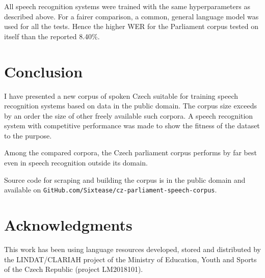 \documentclass[runningheads]{llncs}
\begin{document}
All speech recognition systems were trained with the same hyperparameters as
described above. For a fairer comparison, a common, general language model was
used for all the tests. Hence the higher WER for the Parliament corpus tested on
itself than the reported 8.40\%.

\section{Conclusion}

I have presented a new corpus of spoken Czech suitable for training speech
recognition systems based on data in the public domain. The corpus size exceeds
by an order the size of other freely available such corpora. A speech
recognition system with competitive performance was made to show the fitness
of the dataset to the purpose.

Among the compared corpora, the Czech parliament corpus performs by far best
even in speech recognition outside its domain.

Source code for scraping and building the corpus is in the public domain and
available on \texttt{GitHub.com/Sixtease/cz-parliament-speech-corpus}.

\section*{Acknowledgments}

This work has been using language resources developed, stored and distributed by
the LINDAT/CLARIAH project of the Ministry of Education, Youth and Sports of the
Czech Republic (project LM2018101).




\end{document}

